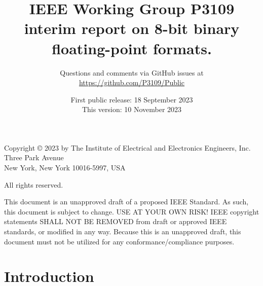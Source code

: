 \documentclass{article}
\title{
IEEE Working Group P3109 interim report
on 8-bit binary floating-point formats.
}
\author{
Questions and comments via GitHub issues at\\\medskip
\url{https://github.com/P3109/Public}
}
\date{
First public release: 18 September 2023
\\
\medskip
This version: 10 November 2023
}
\begin{document}
\maketitle

\begin{table}[b]
Copyright © 2023 by The Institute of Electrical and Electronics Engineers, Inc.\\
Three Park Avenue\\
New York, New York 10016-5997, USA

All rights reserved.

This document is an unapproved draft of a proposed IEEE Standard. As such, this document is subject to change. USE AT YOUR OWN RISK! IEEE copyright statements SHALL NOT BE REMOVED from draft or approved IEEE standards, or modified in any way. Because this is an unapproved draft, this document must not be utilized for any conformance/compliance purposes.
\end{table}



\clearpage

\tableofcontents

\clearpage


\section{Introduction}
\end{document}
